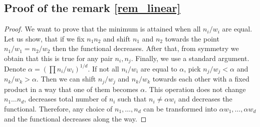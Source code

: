 \documentclass{amsart}
\theoremstyle{remark}
\numberwithin{equation}{section}
\numberwithin{figure}{section}
\begin{document}
\subsection{Proof of the remark \ref{rem_linear}}
\begin{proof}
	We want to prove that the minimum is attained when all $n_i/w_i$ are equal. Let us show, that if we fix $n_1 n_2$ and shift $n_1$ and $n_2$ towards the point $n_1/w_1 = n_2/w_2$ then the functional decreases. After that, from symmetry we obtain that this is true for any pair $n_i, n_j$. Finally, we use a standard argument. Denote $\alpha = (\prod n_i/w_i)^{1/d}$. If not all $n_i/w_i$ are equal to $\alpha$, pick $n_j/w_j < \alpha$ and $n_k/w_k > \alpha$. Then we can shift $n_j/w_j$ and $n_k/w_k$ towards each other with a fixed product in a way that one of them becomes $\alpha$. This operation does not change $n_1 \ldots n_d$, decreases total number of $n_i$ such that $n_i \neq \alpha w_i$ and decreases the functional. Therefore, any choice of $n_1, \ldots, n_d$ can be transformed into $\alpha w_1, \ldots, \alpha w_d$ and the functional decreases along the way.
	

\end{proof}
\end{document}
